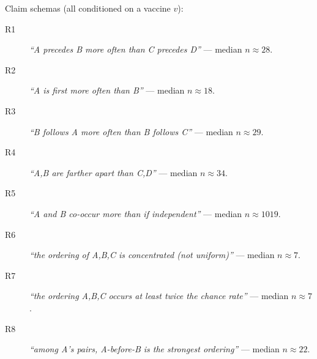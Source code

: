 \documentclass[11pt]{article}
\begin{document}
\noindent Claim schemas (all conditioned on a vaccine $v$):
\begin{description}
\item[R1] \emph{``A precedes B more often than C precedes D''} --- median $n\approx28$.
\item[R2] \emph{``A is first more often than B''} --- median $n\approx18$.
\item[R3] \emph{``B follows A more often than B follows C''} --- median $n\approx29$.
\item[R4] \emph{``A,B are farther apart than C,D''} --- median $n\approx34$.
\item[R5] \emph{``A and B co-occur more than if independent''} --- median $n\approx1019$.
\item[R6] \emph{``the ordering of A,B,C is concentrated (not uniform)''} --- median $n\approx7$.
\item[R7] \emph{``the ordering A,B,C occurs at least twice the chance rate''} --- median $n\approx7$.
\item[R8] \emph{``among A's pairs, A-before-B is the strongest ordering''} --- median $n\approx22$.
\end{description}
\end{document}
